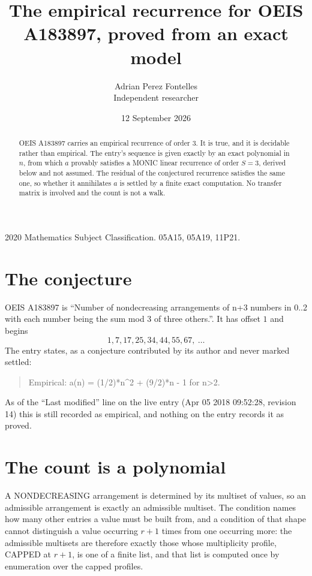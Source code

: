 \documentclass[11pt,a4paper]{article}
\title{The empirical recurrence for OEIS A183897, proved from an exact model}
\author{Adrian Perez Fontelles\\ \small Independent researcher}
\date{12 September 2026}
\theoremstyle{plain}
\theoremstyle{definition}
\begin{document}
\maketitle

\begin{abstract}
OEIS A183897 carries an empirical recurrence of order $3$. It is true, and it is
decidable rather than empirical. The entry's sequence is given exactly by an exact polynomial in $n$, from
which $a$ provably satisfies a MONIC linear recurrence of order $S=3$, derived below and not
assumed. The residual of the conjectured recurrence satisfies the same one, so whether it
annihilates $a$ is settled by a finite exact computation. No transfer matrix is involved and
the count is not a walk.
\end{abstract}

\noindent\small 2020 Mathematics Subject Classification. 05A15, 05A19, 11P21.\normalsize

\section{The conjecture}

OEIS A183897 is ``Number of nondecreasing arrangements of n+3 numbers in 0..2 with each number being the sum mod 3 of three others.''. It has offset $1$ and begins
\[
1, 7, 17, 25, 34, 44, 55, 67,\ \dots
\]
The entry states, as a conjecture contributed by its author and never marked settled:
\begin{quote}
Empirical: a(n) = (1/2)*n\^{}2 + (9/2)*n - 1 for n>2.
\end{quote}
As of the ``Last modified'' line on the live entry (Apr 05 2018 09:52:28, revision 14)
this is still recorded as empirical, and nothing on the entry records it as proved.

\section{The count is a polynomial}

A NONDECREASING arrangement is determined by its multiset of values, so an admissible
arrangement is exactly an admissible multiset. The condition names how many other entries a
value must be built from, and a condition of that shape cannot distinguish a value occurring
$r+1$ times from one occurring more: the admissible multisets are therefore exactly those
whose multiplicity profile, CAPPED at $r+1$, is one of a finite list, and that list is computed
once by enumeration over the capped profiles.
\end{document}
